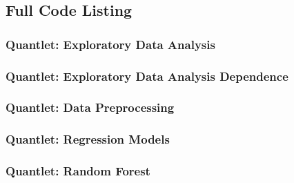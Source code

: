 
\subsection{Full Code Listing}
\subsubsection{Quantlet: Exploratory Data Analysis}

\subsubsection{Quantlet: Exploratory Data Analysis Dependence}

\subsubsection{Quantlet: Data Preprocessing}

\subsubsection{Quantlet: Regression Models}

\subsubsection{Quantlet: Random Forest}

